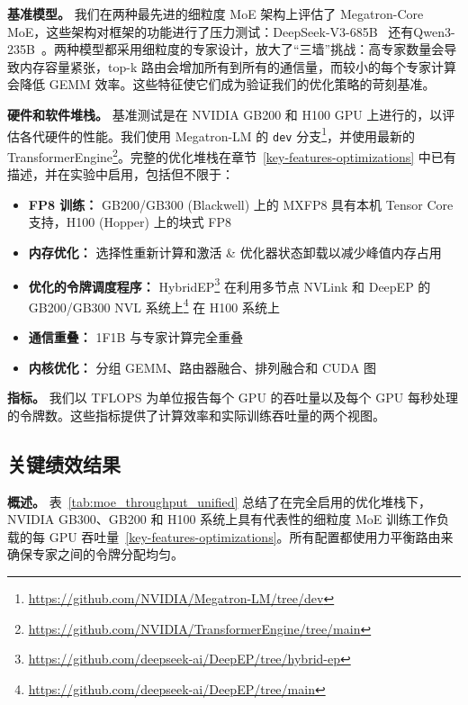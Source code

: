 \documentclass[10pt,logo,copyright]{nvidiatechreport_zh}
\begin{document}
\textbf{基准模型。}
我们在两种最先进的细粒度 MoE 架构上评估了 Megatron-Core MoE，这些架构对框架的功能进行了压力测试：DeepSeek-V3-685B~\cite{deepseekai2025deepseekv3technicalreport} 还有Qwen3-235B~\cite{qwen2025qwen25technicalreport,yang2025qwen3technicalreport}。两种模型都采用细粒度的专家设计，放大了“三墙”挑战：高专家数量会导致内存容量紧张，top-k 路由会增加所有到所有的通信量，而较小的每个专家计算会降低 GEMM 效率。这些特征使它们成为验证我们的优化策略的苛刻基准。

\textbf{硬件和软件堆栈。}
基准测试是在 NVIDIA GB200 和 H100 GPU 上进行的，以评估各代硬件的性能。我们使用 Megatron-LM 的 \texttt{dev} 分支\footnote{\url{https://github.com/NVIDIA/Megatron-LM/tree/dev}}，并使用最新的 TransformerEngine\footnote{\url{https://github.com/NVIDIA/TransformerEngine/tree/main}}。完整的优化堆栈在章节~\ref{key-features-optimizations} 中已有描述，并在实验中启用，包括但不限于：
\begin{itemize}[noitemsep,topsep=0pt]
    \item \textbf{FP8 训练：} GB200/GB300 (Blackwell) 上的 MXFP8 具有本机 Tensor Core 支持，H100 (Hopper) 上的块式 FP8
    \item \textbf{内存优化：} 选择性重新计算和激活 \& 优化器状态卸载以减少峰值内存占用
    \item \textbf{优化的令牌调度程序：} HybridEP\footnote{\url{https://github.com/deepseek-ai/DeepEP/tree/hybrid-ep}} 在利用多节点 NVLink 和 DeepEP 的 GB200/GB300 NVL 系统上\footnote{\url{https://github.com/deepseek-ai/DeepEP/tree/main}} 在 H100 系统上
    \item \textbf{通信重叠：} 1F1B 与专家计算完全重叠
    \item \textbf{内核优化：} 分组 GEMM、路由器融合、排列融合和 CUDA 图
\end{itemize}

\textbf{指标。}
我们以 TFLOPS 为单位报告每个 GPU 的吞吐量以及每个 GPU 每秒处理的令牌数。这些指标提供了计算效率和实际训练吞吐量的两个视图。

\subsection{关键绩效结果}


\textbf{概述。}
表~\ref{tab:moe_throughput_unified} 总结了在完全启用的优化堆栈下，NVIDIA GB300、GB200 和 H100 系统上具有代表性的细粒度 MoE 训练工作负载的每 GPU 吞吐量~\ref{key-features-optimizations}。所有配置都使用力平衡路由来确保专家之间的令牌分配均匀。

\end{document}
